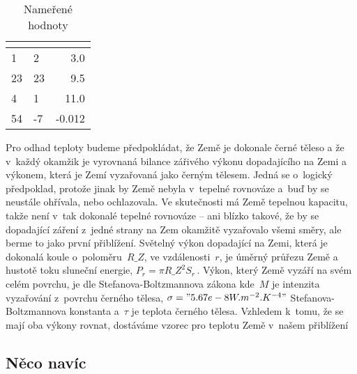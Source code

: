 \documentclass[twoside,fykos]{fksserie}
\begin{document}
\begin{table}
\centering
\begin{tabular}{llD{.}{,}{-1}}
\toprule
{} &  & \\
 & 2 & 3.0\\
23 & 23 & 9.5\\
4 & 1 & 11.0\\
54 & -7 & -0.012\\
\bottomrule
\end{tabular}
\caption{Nameřené hodnoty}
\end{table}


Pro odhad teploty budeme předpokládat, že Země je dokonale černé 
těleso a že v~každý okamžik je vyrovnaná bilance zářivého výkonu 
dopadajícího na Zemi a výkonem, která je Zemí vyzařovaná jako 
černým tělesem. Jedná se o~logický předpoklad, protože jinak by Země
nebyla v~tepelné rovnováze a~buď by se neustále ohřívala, nebo 
ochlazovala. Ve skutečnosti má Země tepelnou kapacitu, takže není 
v~tak dokonalé tepelné rovnováze -- ani blízko takové, že by se 
dopadající záření z~jedné strany na Zem okamžitě vyzařovalo všemi 
směry, ale berme to jako první přiblížení. Světelný výkon dopadající
na Zemi, která je dokonalá koule o~poloměru~$R\_Z$, ve vzdálenosti~$r$,
je úměrný průřezu Země a hustotě toku sluneční energie, $
P_r = \pi R\_Z^2 S_r \,.  
$
Výkon, který Země vyzáří na svém celém povrchu, je dle 
Stefanova-Boltzmannova zákona 
kde~$M$ je intenzita vyzařování z~povrchu černého tělesa, $\sigma
= "5.67e-8 W.m^{-2}.K^{-4}"$ Stefanova-Boltzmannova konstanta 
a~$\tau$ je teplota černého tělesa. Vzhledem k~tomu, že se mají 
oba výkony rovnat, dostáváme vzorec pro teplotu Země v~našem přiblížení

% 



\subsection{Něco navíc}
\end{document}
